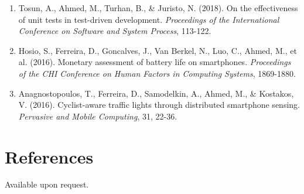 \documentclass[12pt]{article}
\begin{document}
\begin{enumerate}[leftmargin=1.5em]
    \item Tosun, A., Ahmed, M., Turhan, B., \& Juristo, N. (2018). On the effectiveness of unit tests in test-driven development. \textit{Proceedings of the International Conference on Software and System Process}, 113-122.
    \item Hosio, S., Ferreira, D., Goncalves, J., Van Berkel, N., Luo, C., Ahmed, M., et al. (2016). Monetary assessment of battery life on smartphones. \textit{Proceedings of the CHI Conference on Human Factors in Computing Systems}, 1869-1880.
    \item Anagnostopoulos, T., Ferreira, D., Samodelkin, A., Ahmed, M., \& Kostakos, V. (2016). Cyclist-aware traffic lights through distributed smartphone sensing. \textit{Pervasive and Mobile Computing}, 31, 22-36.
\end{enumerate}

\section*{References}

Available upon request.
\end{document}

